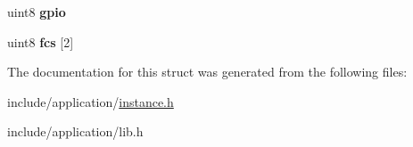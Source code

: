 \begin{DoxyCompactItemize}
\item 
\hypertarget{structiso__IEEE__EUI64__blinkdw__msg_abf500304b683535ed4c61fcadd184c93}{uint8 {\bfseries gpio}}\label{structiso__IEEE__EUI64__blinkdw__msg_abf500304b683535ed4c61fcadd184c93}

\item 
\hypertarget{structiso__IEEE__EUI64__blinkdw__msg_a8e15766cd087ac5d5be692211f1f47e6}{uint8 {\bfseries fcs} \mbox{[}2\mbox{]}}\label{structiso__IEEE__EUI64__blinkdw__msg_a8e15766cd087ac5d5be692211f1f47e6}

\end{DoxyCompactItemize}


The documentation for this struct was generated from the following files\-:\begin{DoxyCompactItemize}
\item 
include/application/\hyperlink{instance_8h}{instance.\-h}\item 
include/application/lib.\-h\end{DoxyCompactItemize}
